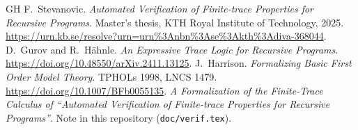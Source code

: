 \documentclass[11pt]{article}
\theoremstyle{plain}
\theoremstyle{definition}
\theoremstyle{remark}
\begin{document}
\begin{thebibliography}{GH}
 F.~Stevanovic. \emph{Automated Verification of Finite-trace
  Properties for Recursive Programs}. Master's thesis, KTH Royal Institute
  of Technology, 2025.
  \url{https://urn.kb.se/resolve?urn=urn\%3Anbn\%3Ase\%3Akth\%3Adiva-368044}.
 D.~Gurov and R.~H\"ahnle. \emph{An Expressive Trace Logic
  for Recursive Programs}.
  \url{https://doi.org/10.48550/arXiv.2411.13125}.
 J.~Harrison. \emph{Formalizing Basic First Order Model
  Theory}. TPHOLs 1998, LNCS 1479.
  \url{https://doi.org/10.1007/BFb0055135}.
 \emph{A Formalization of the Finite-Trace Calculus of
  ``Automated Verification of Finite-trace Properties for Recursive
  Programs''}. Note in this repository (\texttt{doc/verif.tex}).
\end{thebibliography}
\end{document}
